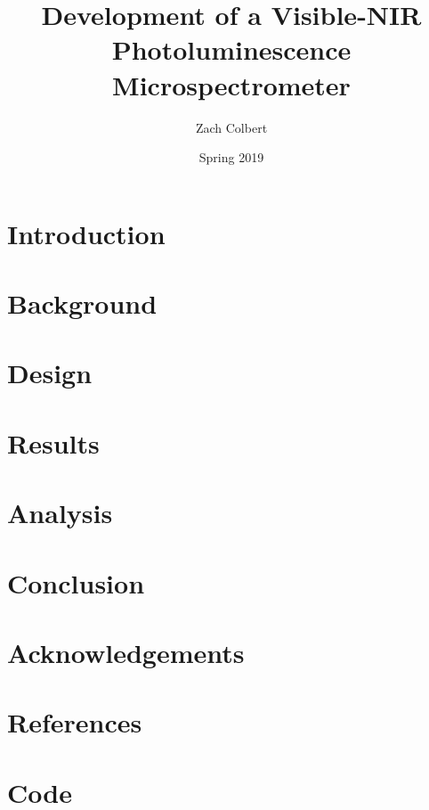 \documentclass{report}
\title{Development of a Visible-NIR Photoluminescence Microspectrometer}
\author{Zach Colbert}
\date{Spring 2019}
\renewenvironment{abstract}
 {%
  \global\setbox\abstractbox=\vtop\bgroup
  \begin{center}\bfseries\abstractname\end{center}%
 }
 {\par\egroup}
\begin{document}


  \tableofcontents


  \chapter{Introduction}
  

  \chapter{Background}
  

  \chapter{Design}

  \chapter{Results}
  

  \chapter{Analysis}

  \chapter{Conclusion}

  \chapter*{Acknowledgements}

  \chapter*{References}


  \appendix
  \chapter{Code}
\end{document}
